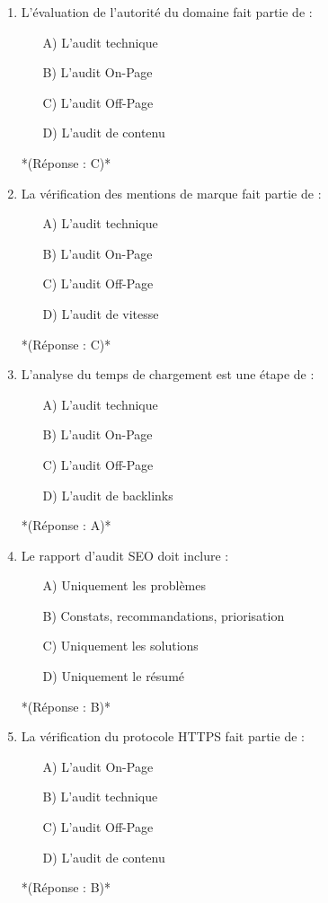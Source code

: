 \documentclass[12pt,a4paper,twoside]{report}
\begin{document}
\begin{enumerate}
    \item L'évaluation de l'autorité du domaine fait partie de :
    \begin{itemize}
        \item[A)] L'audit technique
        \item[B)] L'audit On-Page
        \item[C)] L'audit Off-Page
        \item[D)] L'audit de contenu
    \end{itemize}
    *(Réponse : C)*

    \item La vérification des mentions de marque fait partie de :
    \begin{itemize}
        \item[A)] L'audit technique
        \item[B)] L'audit On-Page
        \item[C)] L'audit Off-Page
        \item[D)] L'audit de vitesse
    \end{itemize}
    *(Réponse : C)*

    \item L'analyse du temps de chargement est une étape de :
    \begin{itemize}
        \item[A)] L'audit technique
        \item[B)] L'audit On-Page
        \item[C)] L'audit Off-Page
        \item[D)] L'audit de backlinks
    \end{itemize}
    *(Réponse : A)*

    \item Le rapport d'audit SEO doit inclure :
    \begin{itemize}
        \item[A)] Uniquement les problèmes
        \item[B)] Constats, recommandations, priorisation
        \item[C)] Uniquement les solutions
        \item[D)] Uniquement le résumé
    \end{itemize}
    *(Réponse : B)*

    \item La vérification du protocole HTTPS fait partie de :
    \begin{itemize}
        \item[A)] L'audit On-Page
        \item[B)] L'audit technique
        \item[C)] L'audit Off-Page
        \item[D)] L'audit de contenu
    \end{itemize}
    *(Réponse : B)*


\end{enumerate}
\end{document}
